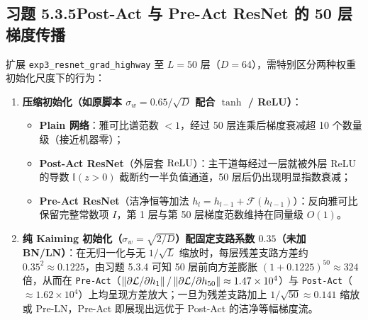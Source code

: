 \subsection*{习题 5.3.5\quad Post-Act 与 Pre-Act ResNet 的 50 层梯度传播}
扩展 \texttt{exp3\_resnet\_grad\_highway} 至 $L = 50$ 层（$D = 64$），需特别区分两种权重初始化尺度下的行为：
\begin{enumerate}[label=(\arabic*), leftmargin=1.8em]
  \item \textbf{压缩初始化（如原脚本 $\sigma_w = 0.65 / \sqrt{D}$ 配合 $\tanh$ / ReLU）}：
  \begin{itemize}
    \item \textbf{Plain 网络}：雅可比谱范数 $< 1$，经过 50 层连乘后梯度衰减超 10 个数量级（接近机器零）；
    \item \textbf{Post-Act ResNet}（外层套 $\operatorname{ReLU}$）：主干道每经过一层就被外层 ReLU 的导数 $\mathbb{I}(z > 0)$ 截断约一半负值通道，50 层后仍出现明显指数衰减；
    \item \textbf{Pre-Act ResNet}（洁净恒等加法 $h_l = h_{l-1} + \mathcal{F}(h_{l-1})$）：反向雅可比保留完整常数项 $I$，第 1 层与第 50 层梯度范数维持在同量级 $O(1)$。
  \end{itemize}

  \item \textbf{纯 Kaiming 初始化（$\sigma_w = \sqrt{2/D}$）配固定支路系数 $0.35$（未加 BN/LN）}：在无归一化与无 $1/\sqrt{L}$ 缩放时，每层残差支路方差约 $0.35^2 \approx 0.1225$，由习题 5.3.4 可知 50 层前向方差膨胀 $(1 + 0.1225)^{50} \approx 324$ 倍，从而在 \texttt{Pre-Act}（$\left\|\partial \mathcal{L}/\partial h_1\right\| / \left\|\partial \mathcal{L}/\partial h_{50}\right\| \approx 1.47\times 10^4$）与 \texttt{Post-Act}（$\approx 1.62\times 10^4$）上均呈现方差放大；一旦为残差支路加上 $1/\sqrt{50} \approx 0.141$ 缩放或 Pre-LN，Pre-Act 即展现出远优于 Post-Act 的洁净等幅梯度流。
\end{enumerate}


